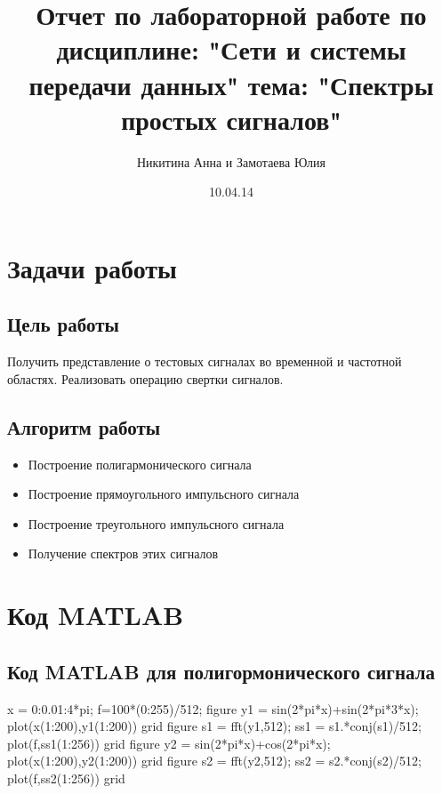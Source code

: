 \documentclass[10pt,a4paper]{report}
\author{Никитина Анна и Замотаева Юлия}
\title{Отчет по лабораторной работе по дисциплине: "Сети и системы передачи данных"\newline
тема: "Спектры простых сигналов"}
\date{10.04.14}
\begin{document}
\maketitle
\pagebreak
\chapter{Задачи работы}
\section{Цель работы}
Получить представление о тестовых сигналах во временной и частотной областях. Реализовать операцию свертки сигналов.
\section{Алгоритм работы}
\begin{itemize}
\item Построение полигармонического сигнала
\item Построение прямоугольного импульсного сигнала
\item Построение треугольного импульсного сигнала
\item Получение спектров этих сигналов
\end{itemize}
\chapter{Код MATLAB}
\section{Код MATLAB для полигормонического сигнала}
x = 0:0.01:4*pi;\newline
f=100*(0:255)/512; \newline
figure\newline
y1 = sin(2*pi*x)+sin(2*pi*3*x);\newline
plot(x(1:200),y1(1:200))\newline
grid\newline
figure\newline
s1 = fft(y1,512);\newline
ss1 = s1.*conj(s1)/512;\newline
plot(f,ss1(1:256))\newline
grid \newline
figure\newline
y2 = sin(2*pi*x)+cos(2*pi*x);  \newline
plot(x(1:200),y2(1:200))  \newline 
grid \newline
figure\newline
s2 = fft(y2,512);\newline
ss2 = s2.*conj(s2)/512;\newline
plot(f,ss2(1:256))\newline
grid \newline
\end{document}
